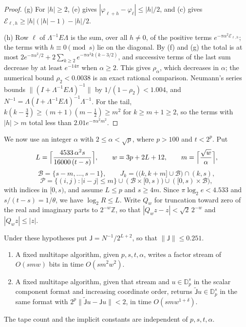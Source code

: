 \begin{proof}
(g) For $|h|\ge2$, (e) gives $|\varphi_{\ell+h}-\varphi_\ell|\le|h|/2$, and (c)
gives $\mathcal E_{\ell,h}\ge|h|(|h|-1)-|h|/2$.

(h) Row $\ell$ of $\Lambda^{-1}E\Lambda$ is the sum, over all $h\ne0$, of the
positive terms $e^{-\pi\alpha^2\mathcal E_{\ell,h}}$; the terms with
$h\equiv0\pmod s$ lie on the diagonal. By (f) and (g) the total is at most
$2e^{-\pi\alpha^2/2}+2\sum_{k\ge2}e^{-\pi\alpha^2k(k-3/2)}$, and successive
terms of the last sum decrease by at least $e^{-14\pi}$ when $\alpha\ge2$.
This gives $\rho_\alpha$, which decreases in $\alpha$; the numerical bound
$\rho_2<0.0038$ is an exact rational comparison. Neumann's series bounds
$\|(I+\Lambda^{-1}E\Lambda)^{-1}\|$ by $1/(1-\rho_2)<1.004$, and
$N^{-1}=\Lambda(I+\Lambda^{-1}E\Lambda)^{-1}\Lambda^{-1}$. For the tail,
$k(k-\frac32)\ge(m+1)(m-\frac12)\ge m^2$ for $k\ge m+1\ge2$, so the terms with
$|h|>m$ total less than $2.01e^{-\pi\alpha^2m^2}$.
\end{proof}

We now use an integer $\alpha$ with $2\le\alpha<\sqrt p$, where $p>100$ and
$t<2^p$. Put
\[
 L=\Bigl\lceil\frac{4533\,\alpha^2s}{16000\,(t-s)}\Bigr\rceil,\qquad
 w=3p+2L+12,\qquad m=\Bigl\lceil\frac{\sqrt w}{\alpha}\Bigr\rceil,
\]
\[
 \mathcal B=\{s-m,\ldots,s-1\},\qquad
 J_k=\bigl((k,k+m]\cup\mathcal B\bigr)\cap(k,s),
\]
\[
 \mathcal P=\{(i,j):|i-j|\le m\}\cup(\mathcal B\times[0,s))\cup([0,s)\times\mathcal B),
\]
with indices in $[0,s)$, and assume $L\le p$ and $s\ge4m$. Since
$\pi\log_2e<4.533$ and $s/(t-s)=1/\theta$, we have $\log_2R\le L$. Write
$Q_w$ for truncation toward zero of the real and imaginary parts to
$2^{-w}\mathbb Z$, so that $|Q_wz-z|<\sqrt2\,2^{-w}$ and $|Q_wz|\le|z|$.

\begin{lemma}\label{lem:banded-solve}
Under these hypotheses put $\mathsf J=N^{-1}/2^{L+2}$, so that
$\|\mathsf J\|\le0.251$.
\begin{enumerate}
\item A fixed multitape algorithm, given $p,s,t,\alpha$, writes a factor
stream of $O(smw)$ bits in time $O(sm^2w^2)$.
\item A fixed multitape algorithm, given that stream and $u\in\mathbb D_p^s$ in
the scalar component format and increasing coordinate order, returns
$\widetilde{\mathsf J}u\in\mathbb D_p^s$ in the same format with
$2^p\|\widetilde{\mathsf J}u-\mathsf Ju\|<2$, in time $O(smw^{1+\delta})$.
\end{enumerate}
The tape count and the implicit constants are independent of $p,s,t,\alpha$.
\end{lemma}

